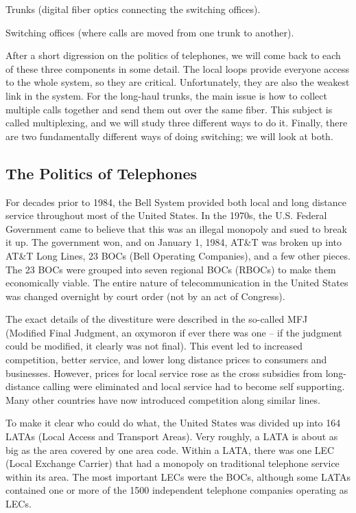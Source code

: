 Trunks (digital fiber optics connecting the switching offices).

Switching offices (where calls are moved from one trunk to another).

After a short digression on the politics of telephones, we will come
back to each of these three components in some detail. The local loops
provide everyone access to the whole system, so they are critical.
Unfortunately, they are also the weakest link in the system. For the
long-haul trunks, the main issue is how to collect multiple calls
together and send them out over the same fiber. This subject is called
multiplexing, and we will study three different ways to do it. Finally,
there are two fundamentally different ways of doing switching; we will
look at both.

\protect\hypertarget{0130661023_ch02lev1sec5.htmlux5cux23ch02lev2sec18}{}{}

\subsection{The Politics of Telephones}

For decades prior to 1984, the Bell System provided both local and long
distance service throughout most of the United States. In the 1970s, the
U.S. Federal Government came to believe that this was an illegal
monopoly and sued to break it up. The government won, and on January 1,
1984, AT\&T was broken up into AT\&T Long Lines, 23 {BOC}s ({Bell
Operating Companies}), and a few other pieces. The 23 BOCs were grouped
into seven regional BOCs (RBOCs) to make them economically viable. The
entire nature of telecommunication in the United States was changed
overnight by court order ({not} by an act of Congress).

The exact details of the divestiture were described in the so-called
{MFJ} ({Modified Final Judgment}, an oxymoron if ever there was one -- if
the judgment could be modified, it clearly was not final). This event
led to increased competition, better service, and lower long distance
prices to consumers and businesses. However, prices for local service
rose as the cross subsidies from long-distance calling were eliminated
and local service had to become self supporting. Many other countries
have now introduced competition along similar lines.

To make it clear who could do what, the United States was divided up
into 164 {LATA}s ({Local Access and Transport Areas}). Very roughly, a
LATA is about as big as the area covered by one area code. Within a
LATA, there was one {LEC} ({Local Exchange Carrier}) that had a monopoly
on traditional telephone service within its area. The most important
LECs were the BOCs, although some LATAs contained one or more of the
1500 independent telephone companies operating as LECs.


